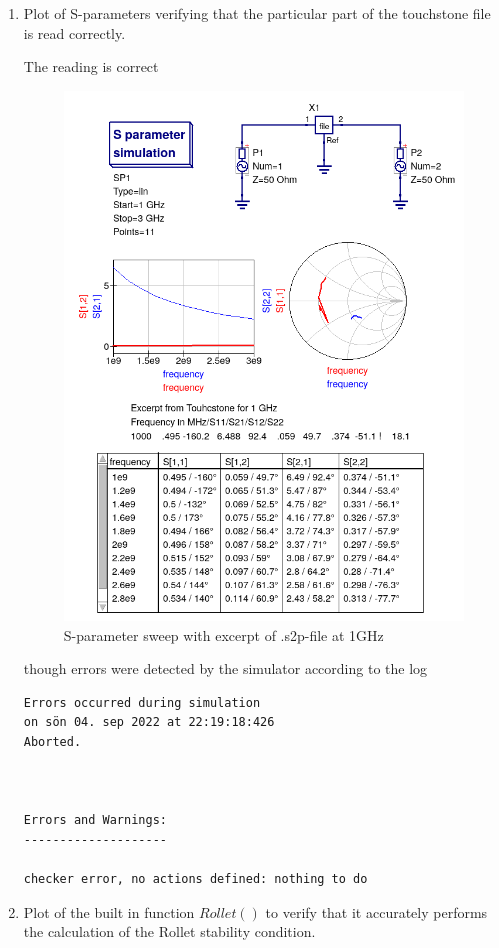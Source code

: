 \documentclass{article}
\begin{document}
\begin{multicols}{2}
\begin{enumerate}[label=(\alph*)]
\item Plot of S-parameters verifying that the particular part of the touchstone file is read correctly.

The reading is correct
\begin{figure}[H]
  \includegraphics[width=\linewidth]{tline7.png}
  \caption{S-parameter sweep with excerpt of .s2p-file at 1GHz}
  \label{fig4}
\end{figure}
though errors were detected by the simulator according to the log
\begin{verbatim}
Errors occurred during simulation
on sön 04. sep 2022 at 22:19:18:426
Aborted.



Errors and Warnings:
--------------------

checker error, no actions defined: nothing to do

\end{verbatim}

\item Plot of the built in function $Rollet()$ to verify that it accurately performs the calculation of the
Rollet stability condition.


\end{enumerate}
\end{multicols}
\end{document}
